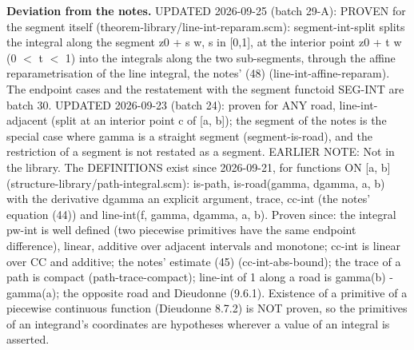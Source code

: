 \noindent\textbf{Deviation from the notes.} UPDATED 2026-09-25 (batch 29-A): PROVEN for the segment itself (theorem-library/line-int-reparam.scm): segment-int-split splits the integral along the segment z0 + s w, s in [0,1], at the interior point z0 + t w (0 $<$ t $<$ 1) into the integrals along the two sub-segments, through the affine reparametrisation of the line integral, the notes' (48) (line-int-affine-reparam). The endpoint cases and the restatement with the segment functoid SEG-INT are batch 30. UPDATED 2026-09-23 (batch 24): proven for ANY road, line-int-adjacent (split at an interior point c of [a, b]); the segment of the notes is the special case where gamma is a straight segment (segment-is-road), and the restriction of a segment is not restated as a segment. EARLIER NOTE: Not in the library. The DEFINITIONS exist since 2026-09-21, for functions ON [a, b] (structure-library/path-integral.scm): is-path, is-road(gamma, dgamma, a, b) with the derivative dgamma an explicit argument, trace, cc-int (the notes' equation (44)) and line-int(f, gamma, dgamma, a, b). Proven since: the integral pw-int is well defined (two piecewise primitives have the same endpoint difference), linear, additive over adjacent intervals and monotone; cc-int is linear over CC and additive; the notes' estimate (45) (cc-int-abs-bound); the trace of a path is compact (path-trace-compact); line-int of 1 along a road is gamma(b) - gamma(a); the opposite road and Dieudonne (9.6.1). Existence of a primitive of a piecewise continuous function (Dieudonne 8.7.2) is NOT proven, so the primitives of an integrand's coordinates are hypotheses wherever a value of an integral is asserted.
%
\renewcommand{\thethm}{3.5}
